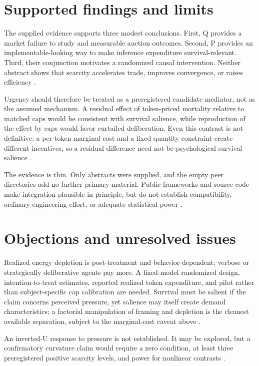 \documentclass{article}
\begin{document}
\section{Supported findings and limits}

The supplied evidence supports three modest conclusions.  First, Q provides a market failure to study and measurable auction outcomes.  Second, P provides an implementable-looking way to make inference expenditure survival-relevant.  Third, their conjunction motivates a randomized causal intervention.  Neither abstract shows that scarcity accelerates trade, improves convergence, or raises efficiency .

Urgency should therefore be treated as a preregistered candidate mediator, not as the assumed mechanism.  A residual effect of token-priced mortality relative to matched caps would be consistent with survival salience, while reproduction of the effect by caps would favor curtailed deliberation.  Even this contrast is not definitive: a per-token marginal cost and a fixed quantity constraint create different incentives, so a residual difference need not be psychological survival salience .

The evidence is thin.  Only abstracts were supplied, and the empty peer directories add no further primary material.  Public frameworks and source code make integration plausible in principle, but do not establish compatibility, ordinary engineering effort, or adequate statistical power .

\section{Objections and unresolved issues}

Realized energy depletion is post-treatment and behavior-dependent: verbose or strategically deliberative agents pay more.  A fixed-model randomized design, intention-to-treat estimates, reported realized token expenditure, and pilot rather than subject-specific cap calibration are needed.  Survival must be salient if the claim concerns perceived pressure, yet salience may itself create demand characteristics; a factorial manipulation of framing and depletion is the cleanest available separation, subject to the marginal-cost caveat above .

An inverted-U response to pressure is not established.  It may be explored, but a confirmatory curvature claim would require a zero condition, at least three preregistered positive scarcity levels, and power for nonlinear contrasts .
\end{document}
